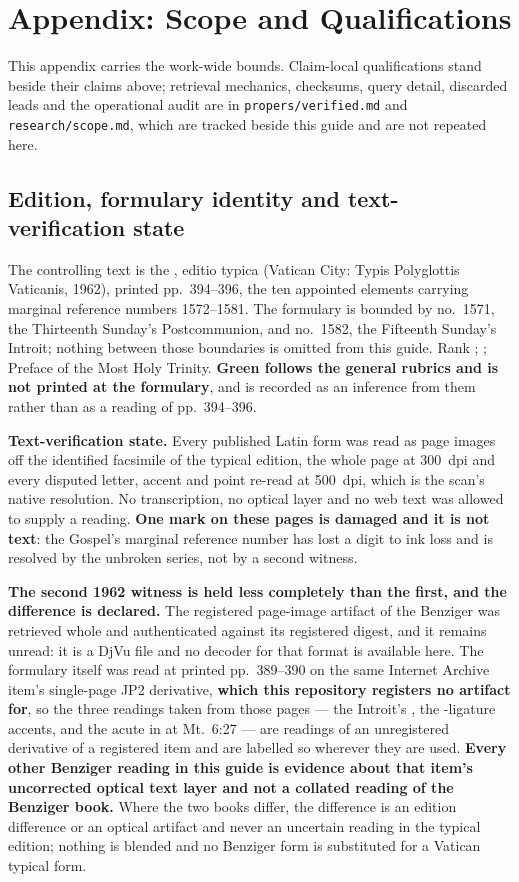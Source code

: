 \sectionguard
\section*{Appendix: Scope and Qualifications}

This appendix carries the work-wide bounds. Claim-local qualifications stand
beside their claims above; retrieval mechanics, checksums, query detail,
discarded leads and the operational audit are in \texttt{propers/verified.md}
and \texttt{research/scope.md}, which are tracked beside this guide and are not
repeated here.

\subsection*{Edition, formulary identity and text-verification state}

The controlling text is the , editio typica (Vatican
City: Typis Polyglottis Vaticanis, 1962), printed pp.~394--396, the ten
appointed elements carrying marginal reference numbers 1572--1581. The
formulary is bounded by no.~1571, the Thirteenth Sunday's Postcommunion, and
no.~1582, the Fifteenth Sunday's Introit; nothing between those boundaries is
omitted from this guide. Rank ; ; Preface of the
Most Holy Trinity. \textbf{Green follows the general rubrics and is not printed
at the formulary}, and is recorded as an inference from them rather than as a
reading of pp.~394--396.

\textbf{Text-verification state.} Every published Latin form was read as page
images off the identified facsimile of the typical edition, the whole page at
300~dpi and every disputed letter, accent and point re-read at 500~dpi, which is
the scan's native resolution. No transcription, no optical layer and no web text
was allowed to supply a reading. \textbf{One mark on these pages is damaged and
it is not text}: the Gospel's marginal reference number has lost a digit to ink
loss and is resolved by the unbroken series, not by a second witness.

\textbf{The second 1962 witness is held less completely than the first, and the
difference is declared.} The registered page-image artifact of the Benziger
 was retrieved whole and authenticated against its
registered digest, and it remains unread: it is a DjVu file and no decoder for
that format is available here. The formulary itself was read at printed
pp.~389--390 on the same Internet Archive item's single-page JP2 derivative,
\textbf{which this repository registers no artifact for}, so the three readings
taken from those pages --- the Introit's , the -ligature
accents, and the acute in  at Mt.\ 6:27 --- are readings of an
unregistered derivative of a registered item and are labelled so wherever they
are used. \textbf{Every other Benziger reading in this guide is evidence about
that item's uncorrected optical text layer and not a collated reading of the
Benziger book.} Where the two
books differ, the difference is an edition difference or an optical artifact and
never an uncertain reading in the typical edition; nothing is blended and no
Benziger form is substituted for a Vatican typical form.

